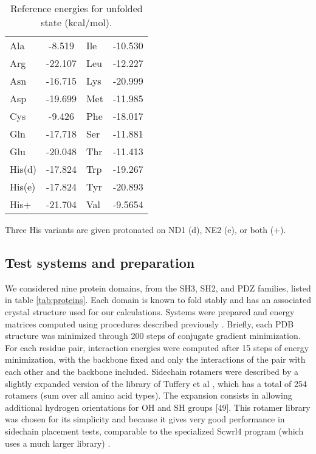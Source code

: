 \begin{table}[!htbp]

      \begin{center}
        \caption{Reference energies for unfolded state (kcal/mol).}
        \label{tab:erefcasa}
      \begin{tabular}{lclc}
        \toprule

        Ala    &  -8.519    &  Ile    & -10.530    \\
        Arg    & -22.107    &  Leu    & -12.227    \\
        Asn    & -16.715    &  Lys    & -20.999    \\
        Asp    & -19.699    &  Met    & -11.985    \\
        Cys    & -9.426     &  Phe    & -18.017    \\
        Gln    & -17.718    &  Ser    & -11.881    \\
        Glu    & -20.048    &  Thr    & -11.413    \\
        His(d) & -17.824    &  Trp    & -19.267    \\
        His(e) & -17.824    &  Tyr    & -20.893    \\
        His+   & -21.704    &  Val    & -9.5654    \\
        \bottomrule
      \end{tabular}

{\small \noindent Three His variants are given protonated on ND1 (d), NE2 (e), or both (+).
}
      \end{center}      
    \end{table}


\subsection{Test systems and preparation}
We considered nine protein domains, from the SH3, SH2, and PDZ families, listed in table \ref{tab:proteins}.
Each domain is known to fold stably and has an associated crystal structure used for our calculations. Systems were prepared and energy matrices computed using procedures described previously \cite{Schmidt09,Schmidt10}.
Briefly, each PDB structure was minimized through 200 steps of conjugate gradient minimization. For each residue pair, interaction energies were computed after 15 steps of energy minimization, with the backbone fixed and only the interactions of the pair with each other and the backbone included. Sidechain rotamers were described by a slightly expanded version of the library of Tuffery et al \cite{Tuffery91}, which has a total of 254 rotamers (sum over all amino acid types).
The expansion consists in allowing additional hydrogen orientations for OH and SH groups [49].
This rotamer library was chosen for its simplicity and because it gives very good performance in sidechain placement tests, comparable to the specialized Scwrl4 program (which uses a much larger library) \cite{Krivov09,Gaillard16}.

